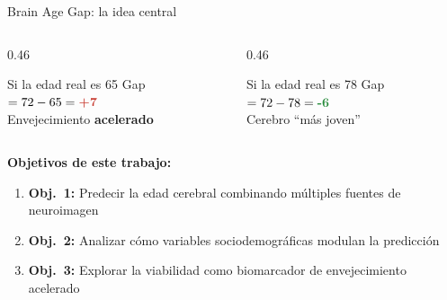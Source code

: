 \documentclass[aspectratio=169, 11pt]{beamer}
\newcommand{\highlight}[1]{\textcolor{uncaccent}{\textbf{#1}}}
\begin{document}
\begin{frame}{Brain Age Gap: la idea central}
  \centering
  \shorthandoff{>}
  \shorthandon{>}

  \vspace{0.3cm}
  \begin{columns}[T]
    \begin{column}{0.46\textwidth}
      \begin{block}{Si la edad real es 65}
        \centering
        Gap $= 72 - 65 = \highlight{+7}$\\[3pt]
        {\small Envejecimiento \textbf{acelerado}}
      \end{block}
    \end{column}
    \begin{column}{0.46\textwidth}
      \begin{block}{Si la edad real es 78}
        \centering
        Gap $= 72 - 78 = \textcolor{uncgreen}{\textbf{-6}}$\\[3pt]
        {\small Cerebro ``más joven''}
      \end{block}
    \end{column}
  \end{columns}

  \vspace{0.25cm}
  {\small \textbf{Objetivos de este trabajo:}
  \begin{enumerate}
    \item \textbf{Obj.\ 1:} Predecir la edad cerebral combinando múltiples fuentes de neuroimagen
    \item \textbf{Obj.\ 2:} Analizar cómo variables sociodemográficas modulan la predicción
    \item \textbf{Obj.\ 3:} Explorar la viabilidad como biomarcador de envejecimiento acelerado
  \end{enumerate}
  }
\end{frame}
\end{document}
